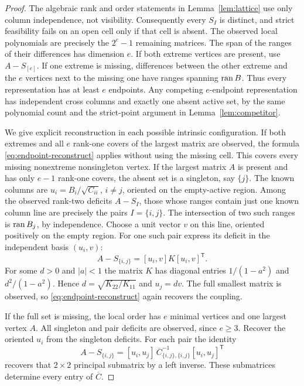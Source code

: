 \begin{proof}
The algebraic rank and order statements in Lemma~\ref{lem:lattice} use only
column independence, not visibility. Consequently every $S_I$ is distinct,
and strict feasibility fails on an open cell only if that cell is absent.
The observed local polynomials are precisely the $2^e-1$ remaining matrices.
The span of the ranges of their differences has dimension $e$. If both extreme
vertices are present, use $A-S_{[e]}$. If one extreme is missing, differences
between the other extreme and the $e$ vertices next to the missing one have
ranges spanning $\operatorname{ran} B$. Thus every representation has at least $e$
endpoints. Any competing $e$-endpoint representation has independent cross
columns and exactly one absent active set, by the same polynomial count and
the strict-point argument in Lemma~\ref{lem:competitor}.

We give explicit reconstruction in each possible intrinsic configuration.
If both extremes and all $e$ rank-one covers of the largest matrix are
observed, the formula \eqref{eq:endpoint-reconstruct} applies without using
the missing cell. This covers every missing nonextreme nonsingleton vertex.
If the largest matrix $A$ is present and has only $e-1$ rank-one covers,
the absent set is a singleton, say $\{j\}$. The known columns are
$u_i=B_i/\sqrt{C_{ii}}$, $i\ne j$, oriented on the empty-active region.
Among the observed rank-two deficits $A-S_I$, those whose ranges contain
just one known column line are precisely the pairs $I=\{i,j\}$. The
intersection of two such ranges is $\operatorname{ran} B_j$, by independence. Choose a
unit vector $v$ on this line, oriented positively on the empty region.
For one such pair express its deficit in the independent basis $(u_i,v)$:
\[
 A-S_{\{i,j\}}=[u_i,v]K[u_i,v]^{\mathsf T}.
\]
For some $d>0$ and $|a|<1$ the matrix $K$ has diagonal entries
$1/(1-a^2)$ and $d^2/(1-a^2)$. Hence $d=\sqrt{K_{22}/K_{11}}$ and
$u_j=dv$. The full smallest matrix is observed, so
\eqref{eq:endpoint-reconstruct} again recovers the coupling.

If the full set is missing, the local order has $e$ minimal vertices and
one largest vertex $A$. All singleton and pair deficits are observed,
since $e\ge3$. Recover the oriented $u_i$ from the singleton deficits.
For each pair the identity
\[
 A-S_{\{i,j\}}=[u_i,u_j]\,
 \overline C_{\{i,j\},\{i,j\}}^{-1}[u_i,u_j]^{\mathsf T}
\]
recovers that $2\times2$ principal submatrix by a left inverse. These
submatrices determine every entry of $\overline C$.


\end{proof}
